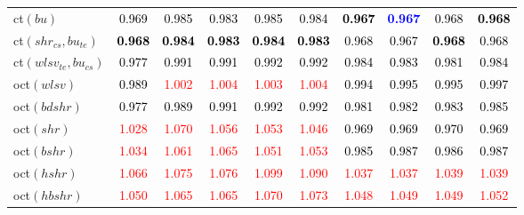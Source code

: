 \begin{tabular}[t]{>{\centering\arraybackslash}m{2.5cm}ccccccccc}
ct$(bu)$ & \textcolor{black}{0.969} & \textcolor{black}{0.985} & \textcolor{black}{0.983} & \textcolor{black}{0.985} & \textcolor{black}{0.984} & \textcolor{black}{\textbf{0.967}} & \textcolor{blue}{\textbf{0.967}} & \textcolor{black}{0.968} & \textcolor{black}{\textbf{0.968}}\\
ct$(shr_{cs}, bu_{te})$ & \textcolor{black}{\textbf{0.968}} & \textcolor{black}{\textbf{0.984}} & \textcolor{black}{\textbf{0.983}} & \textcolor{black}{\textbf{0.984}} & \textcolor{black}{\textbf{0.983}} & \textcolor{black}{0.968} & \textcolor{black}{0.967} & \textcolor{black}{\textbf{0.968}} & \textcolor{black}{0.968}\\
ct$(wlsv_{te}, bu_{cs})$ & \textcolor{black}{0.977} & \textcolor{black}{0.991} & \textcolor{black}{0.991} & \textcolor{black}{0.992} & \textcolor{black}{0.992} & \textcolor{black}{0.984} & \textcolor{black}{0.983} & \textcolor{black}{0.981} & \textcolor{black}{0.984}\\
oct$(wlsv)$ & \textcolor{black}{0.989} & \textcolor{red}{1.002} & \textcolor{red}{1.004} & \textcolor{red}{1.003} & \textcolor{red}{1.004} & \textcolor{black}{0.994} & \textcolor{black}{0.995} & \textcolor{black}{0.995} & \textcolor{black}{0.997}\\
oct$(bdshr)$ & \textcolor{black}{0.977} & \textcolor{black}{0.989} & \textcolor{black}{0.991} & \textcolor{black}{0.992} & \textcolor{black}{0.992} & \textcolor{black}{0.981} & \textcolor{black}{0.982} & \textcolor{black}{0.983} & \textcolor{black}{0.985}\\
oct$(shr)$ & \textcolor{red}{1.028} & \textcolor{red}{1.070} & \textcolor{red}{1.056} & \textcolor{red}{1.053} & \textcolor{red}{1.046} & \textcolor{black}{0.969} & \textcolor{black}{0.969} & \textcolor{black}{0.970} & \textcolor{black}{0.969}\\
oct$(bshr)$ & \textcolor{red}{1.034} & \textcolor{red}{1.061} & \textcolor{red}{1.065} & \textcolor{red}{1.051} & \textcolor{red}{1.053} & \textcolor{black}{0.985} & \textcolor{black}{0.987} & \textcolor{black}{0.986} & \textcolor{black}{0.987}\\
oct$(hshr)$ & \textcolor{red}{1.066} & \textcolor{red}{1.075} & \textcolor{red}{1.076} & \textcolor{red}{1.099} & \textcolor{red}{1.090} & \textcolor{red}{1.037} & \textcolor{red}{1.037} & \textcolor{red}{1.039} & \textcolor{red}{1.039}\\
oct$(hbshr)$ & \textcolor{red}{1.050} & \textcolor{red}{1.065} & \textcolor{red}{1.065} & \textcolor{red}{1.070} & \textcolor{red}{1.073} & \textcolor{red}{1.048} & \textcolor{red}{1.049} & \textcolor{red}{1.049} & \textcolor{red}{1.052}\\

\end{tabular}
